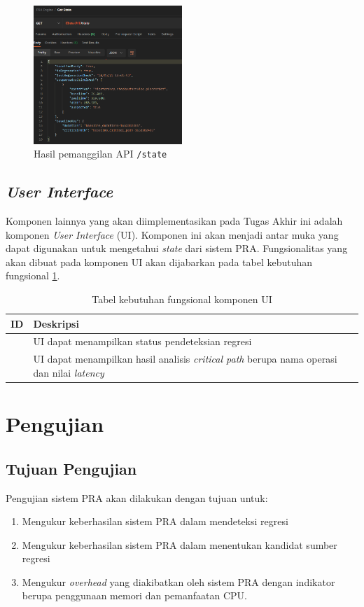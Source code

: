 \begin{figure}[!htb]
	\centering
	\includegraphics[width=0.5\textwidth]{resources/ch4/result_state.png}
	\caption{Hasil pemanggilan API \texttt{/state}}
	\label{api_state}
\end{figure} 




\subsection{\textit{User Interface}}
Komponen lainnya yang akan diimplementasikan pada Tugas Akhir ini adalah komponen \textit{User Interface} (UI). Komponen ini akan menjadi antar muka yang dapat digunakan untuk mengetahui \textit{state} dari sistem PRA. Fungsionalitas yang akan dibuat pada komponen UI akan dijabarkan pada tabel kebutuhan  fungsional \ref{ui-functional}.
\begin{small}
	\begin{longtable}{ | p{3cm} | p{9cm} | }
		\caption{Tabel kebutuhan fungsional komponen UI}
		\label{ui-functional}                                                           
		\\ \hline
		\centering\bfseries{ID} & \centering\bfseries{Deskripsi} \tabularnewline \hline
		\endfirsthead
		\centering{UI-1} & UI dapat menampilkan status pendeteksian regresi  \\ \hline
		\centering{UI-2} & UI dapat menampilkan hasil analisis \textit{critical path} berupa nama operasi dan nilai \textit{latency} \\ \hline

	\end{longtable}
\end{small}

\section{Pengujian}
\subsection{Tujuan Pengujian}
Pengujian sistem PRA akan dilakukan dengan tujuan untuk:
\begin{enumerate}
	\item Mengukur keberhasilan sistem PRA dalam mendeteksi regresi
	\item Mengukur keberhasilan sistem PRA dalam menentukan kandidat sumber regresi
	\item Mengukur \textit{overhead} yang diakibatkan oleh sistem PRA dengan
	indikator berupa penggunaan memori dan pemanfaatan CPU.
\end{enumerate}
